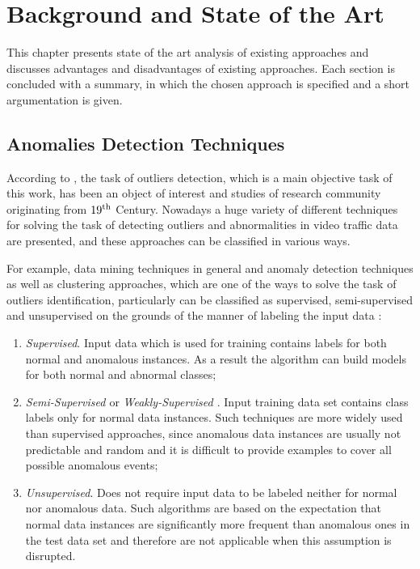 \chapter{Background and State of the Art}
\label{ch:Background and State of the Art}

This chapter presents state of the art analysis of existing approaches and discusses advantages and disadvantages of existing approaches. Each section is concluded with a summary, in which the chosen approach is specified and a short argumentation is given.

\section{Anomalies Detection Techniques}

According to \cite{article:15_survey_ad}, the task of outliers detection, which is a main objective task of this work, has been an object of interest and studies of research community originating from $19\textsuperscript{th}$ Century. Nowadays a huge variety of different techniques for solving the task of detecting outliers and abnormalities in video traffic data are presented, and these approaches can be classified in various ways.

For example, data mining techniques in general and anomaly detection techniques as well as clustering approaches, which are one of the ways to solve the task of outliers identification, particularly can be classified as supervised, semi-supervised and unsupervised on the grounds of the manner of labeling the input data \cite{article:15_survey_ad}\cite{article:comp_analys_odt}:

\begin{enumerate}
	\setlength\itemsep{0em}
	\item \textit{Supervised}. Input data which is used for training contains labels for both normal and anomalous instances. As a result the algorithm can build models for both normal and abnormal classes;
	\item \textit{Semi-Supervised \cite{article:15_survey_ad}} or \textit{Weakly-Supervised \cite{article:5_survey_tbsa}}. Input training data set contains class labels only for normal data instances. Such techniques are more widely used than supervised approaches, since anomalous data instances are usually not predictable and random and it is difficult to provide examples to cover all possible anomalous events;
	\item \textit{Unsupervised}. Does not require input data to be labeled neither for normal nor anomalous data. Such algorithms are based on the expectation that normal data instances are significantly more frequent than anomalous ones in the test data set and therefore are not applicable when this assumption is disrupted.
\end{enumerate}

